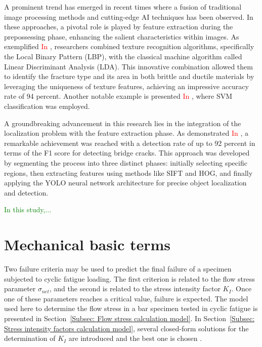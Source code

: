 \documentclass[preprint,12pt]{elsarticle}
\begin{document}
    A prominent trend has emerged in recent times where a fusion of traditional image processing methods and cutting-edge AI techniques has been observed.
    In these approaches, a pivotal role is played by feature extraction during the prepossessing phase, enhancing the salient characteristics within images.
    As exemplified \textcolor{red}{In \cite{naik2019identification}}, researchers combined texture recognition algorithms, specifically the Local Binary Pattern (LBP), with the classical machine algorithm called Linear Discriminant Analysis (LDA). This innovative combination allowed them to identify the fracture type and its area in both brittle and ductile materials by leveraging the uniqueness of texture features, achieving an impressive accuracy rate of 94 percent.
    Another notable example is presented \textcolor{red}{In \cite{bastidas2016fractographic}}, where SVM classification was employed.

    A groundbreaking advancement in this research lies in the integration of the localization problem with the feature extraction phase.
    As demonstrated \textcolor{red}{In \cite{zhang2023automated}}, a remarkable achievement was reached with a detection rate of up to 92 percent in terms of the F1 score for detecting bridge cracks.
    This approach was developed by segmenting the process into three distinct phases: initially selecting specific regions, then extracting features using methods like SIFT and HOG, and finally applying the YOLO neural network architecture for precise object localization and detection.


\textcolor{green}{In this study,...}






\section{Mechanical basic terms}  \label{sec:Basic terms}


Two failure criteria may be used to predict the final failure of a specimen subjected to cyclic fatigue loading. The first criterion is related to the flow stress parameter \(\sigma_{net}\), and the second is related to the stress intensity factor \(K_{I}\). Once one of these parameters reaches a critical value, failure is expected. The model used here to determine the flow stress in a bar specimen tested in cyclic fatigue is presented in Section~\ref{Subsec: Flow stress calculation model}.
In Section~\ref{Subsec: Stress intensity factors calculation model}, several closed-form solutions for the determination of \(K_I\) are introduced and the best one is chosen \cite{shin2004experimental}.
\end{document}

